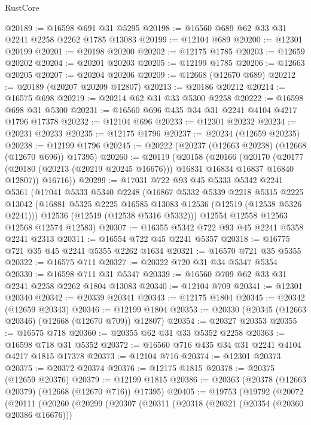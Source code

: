 \begin{lexlean}{RustCore}
\begin{coremodule}
@20189 := @16598 @691 @31 @5295
@20198 := @16560 @689 @62 @33 @31 @2241 @2258 @2262 @1785 @13083
@20199 := @12104 @689
@20200 := @12301 @20199
@20201 := @20198 @20200
@20202 := @12175 @1785
@20203 := @12659 @20202
@20204 := @20201 @20203
@20205 := @12199 @1785
@20206 := @12663 @20205
@20207 := @20204 @20206
@20209 := @12668 (@12670 @689)
@20212 := @20189 (@20207 @20209 @12807)
@20213 := @20186 @20212
@20214 := @16575 @698
@20219 := @20214 @62 @31 @33 @5300 @2258
@20222 := @16598 @698 @31 @5300
@20231 := @16560 @696 @435 @34 @31 @2241 @4104 @4217 @1796 @17378
@20232 := @12104 @696
@20233 := @12301 @20232
@20234 := @20231 @20233
@20235 := @12175 @1796
@20237 := @20234 (@12659 @20235)
@20238 := @12199 @1796
@20245 := @20222 (@20237 (@12663 @20238) (@12668 (@12670 @696)) @17395)
@20260 := @20119
    (@20158
      (@20166
        (@20170
          (@20177 (@20180 (@20213 (@20219 @20245 @16676))) @16831 @16834 @16837 @16840 @12807))
        @16716))
@20299 := @17031
    @722
    @93
    @45
    @5333
    @5342
    @2241
    @5361
    (@17041
      @5333
      @5340
      @2248
      (@16867
        @5332
        @5339
        @2218
        @5315
        @2225
        @13042
        (@16881 @5325 @2225 @16585 @13083 @12536 (@12519 (@12538 @5326 @2241)))
        @12536
        (@12519 (@12538 @5316 @5332)))
      @12554
      @12558
      @12563
      @12568
      @12574
      @12583)
@20307 := @16355 @5342 @722 @93 @45 @2241 @5358 @2241 @2313
@20311 := @16554 @722 @45 @2241 @5357
@20318 := @16775 @721 @35 @45 @2241 @5355 @2262 @1634
@20321 := @16570 @721 @35 @5355
@20322 := @16575 @711
@20327 := @20322 @720 @31 @34 @5347 @5354
@20330 := @16598 @711 @31 @5347
@20339 := @16560 @709 @62 @33 @31 @2241 @2258 @2262 @1804 @13083
@20340 := @12104 @709
@20341 := @12301 @20340
@20342 := @20339 @20341
@20343 := @12175 @1804
@20345 := @20342 (@12659 @20343)
@20346 := @12199 @1804
@20353 := @20330 (@20345 (@12663 @20346) (@12668 (@12670 @709)) @12807)
@20354 := @20327 @20353
@20355 := @16575 @718
@20360 := @20355 @62 @31 @33 @5352 @2258
@20363 := @16598 @718 @31 @5352
@20372 := @16560 @716 @435 @34 @31 @2241 @4104 @4217 @1815 @17378
@20373 := @12104 @716
@20374 := @12301 @20373
@20375 := @20372 @20374
@20376 := @12175 @1815
@20378 := @20375 (@12659 @20376)
@20379 := @12199 @1815
@20386 := @20363 (@20378 (@12663 @20379) (@12668 (@12670 @716)) @17395)
@20405 := @19753
    (@19792
      (@20072
        (@20111
          (@20260
            (@20299
              (@20307
                (@20311
                  (@20318
                    (@20321 (@20354 (@20360 @20386 @16676)))

\end{coremodule}
\end{lexlean}

